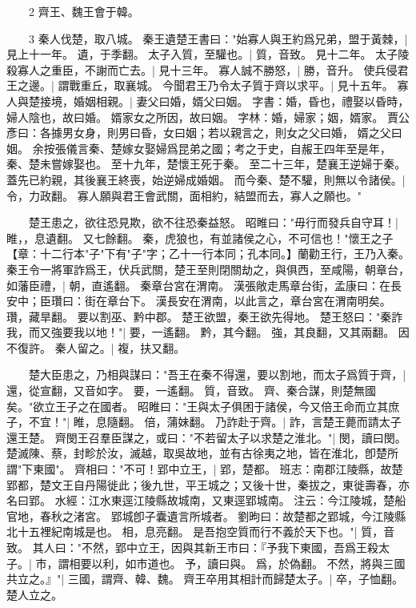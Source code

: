 　　2 齊王、魏王會于韓。


　　3 秦人伐楚，取八城。
	秦王遺楚王書曰："始寡人與王約爲兄弟，盟于黃棘，|{
	見上十一年。
	遺，于季翻。
}
太子入質，至驩也。|{
	質，音致。
	見十二年。
}
太子陵殺寡人之重臣，不謝而亡去。|{
	見十三年。
}
寡人誠不勝怒，|{
	勝，音升。
}
使兵侵君王之邊。|{
	謂戰重丘，取襄城。
}
今聞君王乃令太子質于齊以求平。|{
	見十五年。
}
寡人與楚接境，婚姻相親。|{
	妻父曰婚，婿父曰姻。
	字書：婚，昏也，禮娶以昏時，婦人陰也，故曰婚。
	婿家女之所因，故曰姻。
	字林：婚，婦家；姻，婿家。
	賈公彥曰：各據男女身，則男曰昏，女曰姻；若以親言之，則女之父曰婚， 婿之父曰姻。
	余按張儀言秦、楚嫁女娶婦爲昆弟之國；考之于史，自赧王四年至是年，秦、楚未嘗嫁娶也。
	至十九年，楚懷王死于秦。
	至二十三年，楚襄王逆婦于秦。
	蓋先已約親，其後襄王終喪，始逆婦成婚姻。
}
而今秦、楚不驩，則無以令諸侯。|{
	令，力政翻。
}
寡人願與君王會武關，面相約，結盟而去，寡人之願也。"

　　楚王患之，欲往恐見欺，欲不往恐秦益怒。
	昭睢曰："毋行而發兵自守耳！|{
	睢，，息遺翻。
	又七餘翻。
}
秦，虎狼也，有並諸侯之心，不可信也！"懷王之子【章：十二行本"子"下有"子"字；乙十一行本同；孔本同。】蘭勸王行，王乃入秦。
	秦王令一將軍詐爲王，伏兵武關，楚王至則閉關劫之，與俱西，至咸陽，朝章台，如藩臣禮，|{
	朝，直遙翻。
	秦章台宮在渭南。
	漢張敞走馬章台街，孟康曰：在長安中；臣瓚曰：街在章台下。
	漢長安在渭南，以此言之，章台宮在渭南明矣。
	瓚，藏旱翻。
}
要以割巫、黔中郡。
	楚王欲盟，秦王欲先得地。
	楚王怒曰："秦詐我，而又強要我以地！"|{
	要，一遙翻。
	黔，其今翻。
	強，其良翻，又其兩翻。
}
因不復許。
	秦人留之。|{
	複，扶又翻。
}

　　楚大臣患之，乃相與謀曰："吾王在秦不得還，要以割地，而太子爲質于齊，|{
	還，從宣翻，又音如字。
	要，一遙翻。
	質，音致。
}
齊、秦合謀，則楚無國矣。"欲立王子之在國者。
	昭睢曰："王與太子俱困于諸侯，今又倍王命而立其庶子，不宜！"|{
	睢，息隨翻。
	倍，蒲妹翻。
}
乃詐赴于齊。|{
	詐，言楚王薨而請太子還王楚。
}
齊閔王召羣臣謀之，或曰："不若留太子以求楚之淮北。"|{
	閔，讀曰閔。
	楚滅陳、蔡，封畛於汝，滅越，取吳故地，並有古徐夷之地，皆在淮北，卽楚所謂"下東國"。
}
齊相曰："不可！郢中立王，|{
	郢，楚都。
	班志：南郡江陵縣，故楚郢都，楚文王自丹陽徙此；後九世，平王城之；又後十世，秦拔之，東徙壽春，亦名曰郢。
	水經：江水東逕江陵縣故城南，又東逕郢城南。
	注云：今江陵城，楚船官地，春秋之渚宮。
	郢城卽子囊遺言所城者。
	劉昫曰：故楚都之郢城，今江陵縣北十五裡紀南城是也。
	相，息亮翻。
}
是吾抱空質而行不義於天下也。"|{
	質，音致。
}
其人曰："不然，郢中立王，因與其新王市曰：『予我下東國，吾爲王殺太子。|{
	巿，謂相要以利，如巿道也。
	予，讀曰與。
	爲，於偽翻。
}
不然，將與三國共立之。』"|{
	三國，謂齊、韓、魏。
}
齊王卒用其相計而歸楚太子。|{
	卒，子恤翻。
}
楚人立之。


